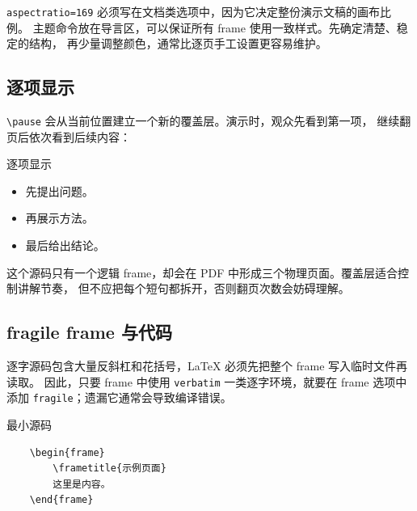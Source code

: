 
\texttt{aspectratio=169} 必须写在文档类选项中，因为它决定整份演示文稿的画布比例。
主题命令放在导言区，可以保证所有 frame 使用一致样式。先确定清楚、稳定的结构，
再少量调整颜色，通常比逐页手工设置更容易维护。

\subsection{逐项显示}

\verb|\pause| 会从当前位置建立一个新的覆盖层。演示时，观众先看到第一项，
继续翻页后依次看到后续内容：

\begin{codeblock}
\begin{frame}{逐项显示}
    \begin{itemize}
        \item 先提出问题。
        \pause
        \item 再展示方法。
        \pause
        \item 最后给出结论。
    \end{itemize}
\end{frame}
\end{codeblock}

这个源码只有一个逻辑 frame，却会在 PDF 中形成三个物理页面。覆盖层适合控制讲解节奏，
但不应把每个短句都拆开，否则翻页次数会妨碍理解。

\subsection{fragile frame 与代码}

逐字源码包含大量反斜杠和花括号，LaTeX 必须先把整个 frame 写入临时文件再读取。
因此，只要 frame 中使用 \texttt{verbatim} 一类逐字环境，就要在 frame 选项中添加
\texttt{fragile}；遗漏它通常会导致编译错误。

\begin{codeblock}
\begin{frame}[fragile]{最小源码}
    \begin{verbatim}
    \begin{frame}
        \frametitle{示例页面}
        这里是内容。
    \end{frame}
    \end{verbatim}
\end{frame}
\end{codeblock}

